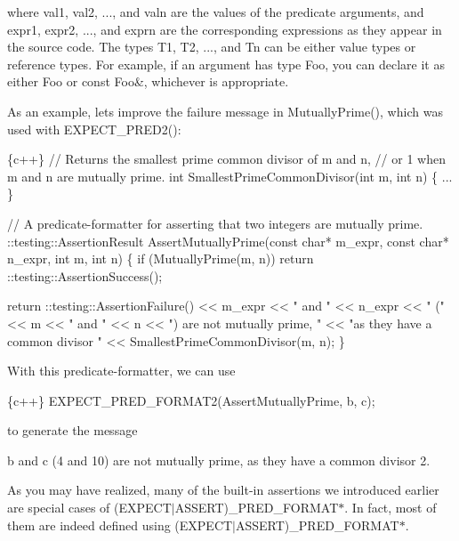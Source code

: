 where {\ttfamily val1}, {\ttfamily val2}, ..., and {\ttfamily valn} are the values of the predicate arguments, and {\ttfamily expr1}, {\ttfamily expr2}, ..., and {\ttfamily exprn} are the corresponding expressions as they appear in the source code. The types {\ttfamily T1}, {\ttfamily T2}, ..., and {\ttfamily Tn} can be either value types or reference types. For example, if an argument has type {\ttfamily Foo}, you can declare it as either {\ttfamily Foo} or {\ttfamily const Foo\&}, whichever is appropriate.

As an example, let\textquotesingle{}s improve the failure message in {\ttfamily Mutually\+Prime()}, which was used with {\ttfamily E\+X\+P\+E\+C\+T\+\_\+\+P\+R\+E\+D2()}\+:


\begin{DoxyCode}
\{c++\}
// Returns the smallest prime common divisor of m and n,
// or 1 when m and n are mutually prime.
int SmallestPrimeCommonDivisor(int m, int n) \{ ... \}

// A predicate-formatter for asserting that two integers are mutually prime.
::testing::AssertionResult AssertMutuallyPrime(const char* m\_expr,
                                               const char* n\_expr,
                                               int m,
                                               int n) \{
  if (MutuallyPrime(m, n)) return ::testing::AssertionSuccess();

  return ::testing::AssertionFailure() << m\_expr << " and " << n\_expr
      << " (" << m << " and " << n << ") are not mutually prime, "
      << "as they have a common divisor " << SmallestPrimeCommonDivisor(m, n);
\}
\end{DoxyCode}


With this predicate-\/formatter, we can use


\begin{DoxyCode}
\{c++\}
  EXPECT\_PRED\_FORMAT2(AssertMutuallyPrime, b, c);
\end{DoxyCode}


to generate the message


\begin{DoxyCode}
b and c (4 and 10) are not mutually prime, as they have a common divisor 2.
\end{DoxyCode}


As you may have realized, many of the built-\/in assertions we introduced earlier are special cases of {\ttfamily (E\+X\+P\+E\+C\+T$\vert$\+A\+S\+S\+E\+RT)\+\_\+\+P\+R\+E\+D\+\_\+\+F\+O\+R\+M\+A\+T$\ast$}. In fact, most of them are indeed defined using {\ttfamily (E\+X\+P\+E\+C\+T$\vert$\+A\+S\+S\+E\+RT)\+\_\+\+P\+R\+E\+D\+\_\+\+F\+O\+R\+M\+A\+T$\ast$}.

